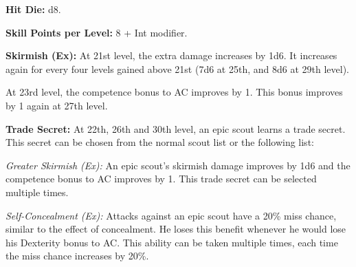 
\MiniWarriorTable{The Epic Scout}{
21 & +15/+10/+5        & +7  & +12 & +7  & Skirmish ~~~~~~ (+6d6/+5 AC)\\
22 & +16/+11/+6/+1     & +7  & +13 & +7  & Trade secret\\
23 & +17/+12/+7/+2     & +7  & +13 & +7  & Skirmish ~~~~~~ (+6d6/+6 AC)\\
24 & +18/+13/+8/+3     & +8  & +14 & +8  & Bonus feat\\
25 & +18/+13/+8/+3     & +8  & +14 & +8  & Special ability, skirmish ~~~~~~ (+7d6/+6 AC)\\
26 & +19/+14/+9/+4     & +8  & +15 & +8  & Trade secret\\
27 & +20/+15/+10/+5    & +9  & +15 & +9  & Skirmish ~~~~~~ (+7d6/+7 AC)\\
28 & +21/+16/+11/+6/+1 & +9  & +16 & +9  & Bonus feat\\
29 & +21/+16/+11/+6/+1 & +9  & +16 & +9  & Skirmish ~~~~~~ (+8d6/+7 AC)\\
30 & +22/+17/+12/+7/+2 & +10 & +17 & +10 & Special ability, trade secret\\
}

\textbf{Hit Die:} d8.

\textbf{Skill Points per Level:} 8 + Int modifier.

\textbf{Skirmish (Ex):} At 21st level, the extra damage increases by 1d6. It increases again for every four levels gained above 21st (7d6 at 25th, and 8d6 at 29th level).

At 23rd level, the competence bonus to AC improves by 1. This bonus improves by 1 again at 27th level.

\textbf{Trade Secret:} At 22th, 26th and 30th level, an epic scout learns a trade secret. This secret can be chosen from the normal scout list or the following list:

\textit{Greater Skirmish (Ex):} An epic scout's skirmish damage improves by 1d6 and the competence bonus to AC improves by 1. This trade secret can be selected multiple times.

\textit{Self-Concealment (Ex):} Attacks against an epic scout have a 20\% miss chance, similar to the effect of concealment. He loses this benefit whenever he would lose his Dexterity bonus to AC. This ability can be taken multiple times, each time the miss chance increases by 20\%.

